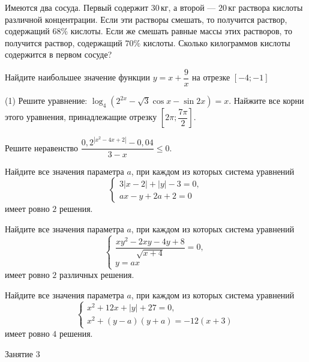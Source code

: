 \begin{homework}[number=1]
	\begin{listofex}
		\item Имеются два сосуда. Первый содержит \( 30 \) кг, а второй --- \( 20 \) кг раствора кислоты различной концентрации. Если эти растворы смешать, то получится раствор, содержащий \( 68\% \) кислоты. Если же смешать равные массы этих растворов, то получится раствор, содержащий \( 70\% \) кислоты. Сколько килограммов кислоты содержится в первом сосуде?
		\item Найдите наибольшее значение функции \( y=x+\dfrac{9}{x} \) на отрезке \( [-4; -1] \)
		\item 
		\begin{tasks}(1)
			\task Решите уравнение: \( \log_4\left( 2^{2x}-\sqrt{3}\cos x-\sin2x \right)=x \).
			\task Найжите все корни этого уравнения, принадлежащие отрезку \( \left[ 2\pi; \dfrac{7\pi}{2} \right]  \).
		\end{tasks}
		\item Решите неравенство \( \dfrac{0,2^{|x^2-4x+2|}-0,04}{3-x}\le0 \).
		\item Найдите все значения параметра \( a \), при каждом из которых система уравнений
		\[ \begin{cases}
			3|x-2|+|y|-3=0,\\
			ax-y+2a+2=0
		\end{cases} \]
		имеет ровно \( 2 \) решения.
		\item Найдите все значения параметра \( a \), при каждом из которых система уравнений
		\[ \begin{cases}
			\dfrac{xy^2-2xy-4y+8}{\sqrt{x+4}}=0,\\
			y=ax
		\end{cases} \]
		имеет ровно \( 2 \) различных решения.
		\item Найдите все значения параметра \( a \), при каждом из которых система уравнений
		\[ \begin{cases}
			x^2+12x+|y|+27=0,\\
			x^2+(y-a)(y+a)=-12(x+3)
		\end{cases} \]
		имеет ровно \( 4 \) решения.
	\end{listofex}
\end{homework}

\begin{class}[number=3]
	\begin{listofex}
		\item Занятие 3 
	\end{listofex}
\end{class}

